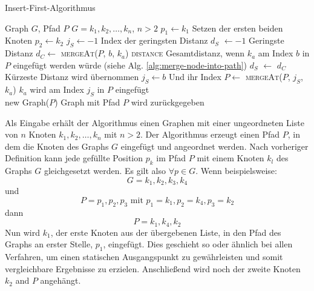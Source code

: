 \begin{algorithm}[H]
    \caption{Insert-First-Algorithmus}
    \label{alg:insert-first}
    \begin{algorithmic}[1]
        \Require Graph $G$, Pfad $P$
        \Require $G = k_1,k_2,\ldots,k_n$, $n > 2$
        \State $p_1 \gets k_1$
        \Comment Setzen der ersten beiden Knoten
        \State $p_2 \gets k_2$
            \State $j_S \gets -1$
            \Comment Index der geringsten Distanz
            \State $d_S$ $\gets -1$
            \Comment Geringste Distanz
                \State $d_C \gets$ \textsc{mergeAt}($P$, $b$, $k_a$) \textsc{distance}
                \Comment Gesamtdistanz, wenn $k_a$ am Index $b$ in $P$ eingefügt werden würde (siehe Alg. \vref{alg:merge-node-into-path})
                    \State $d_S$ $\gets$ $d_C$
                    \Comment Kürzeste Distanz wird übernommen
                    \State $j_S \gets b$
                    \Comment Und ihr Index
                \EndIf
            \EndFor
            \State $P \gets$ \textsc{mergeAt}($P$, $j_S$, $k_a$)
            \Comment $k_a$ wird am Index $j_S$ in $P$ eingefügt
        \EndFor \\
        \Return new Graph($P$)
        \Comment Graph mit Pfad $P$ wird zurückgegeben
    \end{algorithmic}
\end{algorithm}
Als Eingabe erhält der Algorithmus einen Graphen mit einer ungeordneten Liste von $n$ Knoten $k_1,k_2,\ldots,k_n$ mit $n > 2$.
Der Algorithmus erzeugt einen Pfad $P$, in dem die Knoten des Graphs $G$ eingefügt und angeordnet werden.
Nach vorheriger Definition kann jede gefüllte Position $p_k$ im Pfad $P$ mit einem Knoten $k_l$ des Graphs $G$ gleichgesetzt werden.
Es gilt also $\forall p \in G$.
Wenn beispielsweise:
$$G = k_1,k_2,k_3,k_4$$
und
$$P=p_1,p_2,p_3 \textrm{ mit }p_1=k_1,p_2=k_4,p_3=k_2$$
dann
$$P=k_1,k_4,k_2$$
Nun wird $k_1$, der erste Knoten aus der übergebenen Liste, in den Pfad des Graphs an erster Stelle, $p_1$, eingefügt. 
Dies geschieht so oder ähnlich bei allen Verfahren, um einen statischen Ausgangspunkt zu gewährleisten und somit vergleichbare Ergebnisse zu erzielen.
Anschließend wird noch der zweite Knoten $k_2$ and $P$ angehängt.

